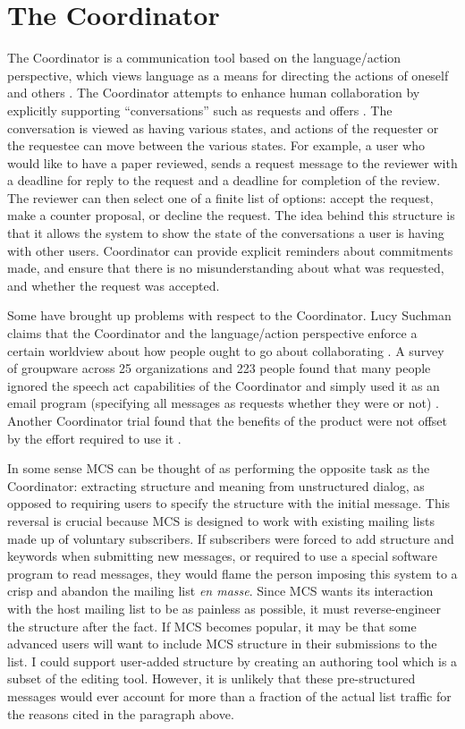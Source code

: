 \section{The Coordinator}
The Coordinator is a communication tool based on the language/action
perspective, which views language as a means for directing the actions of
oneself and others \cite{Winograd87}. The Coordinator attempts to enhance human
collaboration by explicitly supporting ``conversations'' such as requests and
offers \cite{Winograd:1988:WAG}. The conversation is viewed as having various
states, and actions of the requester or the requestee can move between the
various states. For example, a user who would like to have a paper reviewed,
sends a request message to the reviewer with a deadline for reply to the
request and a deadline for completion of the review.  The reviewer can then
select one of a finite list of options: accept the request, make a counter
proposal, or decline the request. The idea behind this structure is that it
allows the system to show the state of the conversations a user is having with
other users. Coordinator can provide explicit reminders about commitments made,
and ensure that there is no misunderstanding about what was requested, and
whether the request was accepted.

Some have brought up problems with respect to the Coordinator. Lucy Suchman
claims that the Coordinator and the language/action perspective enforce a
certain worldview about how people ought to go about collaborating
\cite{Suchman93}. A survey of groupware across 25 organizations and 223 people
found that many people ignored the speech act capabilities of the Coordinator
and simply used it as an email program (specifying all messages as requests
whether they were or not) \cite{Bullen90a}. Another Coordinator trial found
that the benefits of the product were not offset by the effort required to use
it \cite{Carasik88}.

In some sense MCS can be thought of as performing the opposite task as the
Coordinator: extracting structure and meaning from unstructured dialog, as
opposed to requiring users to specify the structure with the initial message.
This reversal is crucial because MCS is designed to work with existing mailing
lists made up of voluntary subscribers. If subscribers were forced to add
structure and keywords when submitting new messages, or required to use a
special software program to read messages, they would flame the person imposing
this system to a crisp and abandon the mailing list {\em en masse}. Since MCS
wants its interaction with the host mailing list to be as painless as possible,
it must reverse-engineer the structure after the fact. If MCS becomes popular,
it may be that some advanced users will want to include MCS structure in their
submissions to the list. I could support user-added structure by creating an
authoring tool which is a subset of the editing tool. However, it is unlikely
that these pre-structured messages would ever account for more than a fraction
of the actual list traffic for the reasons cited in the paragraph above.



